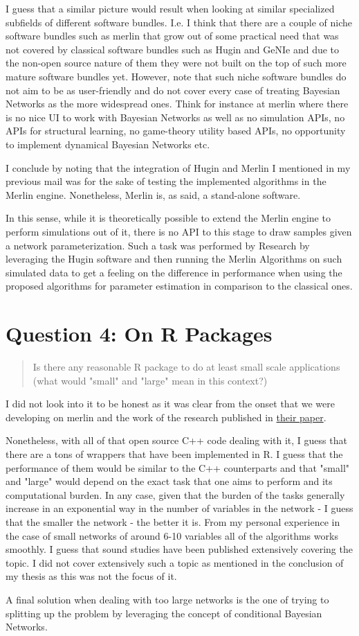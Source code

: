 \documentclass[a4paper]{article}
\begin{document}
I guess that a similar picture would result when looking at similar
specialized subfields of different software bundles. I.e. I think
that there are a couple of niche software bundles such as merlin
that grow out of some practical need that was not covered by
classical software bundles such as Hugin and GeNIe and due to the
non-open source nature of them they were not built on the top of
such more mature software bundles yet. However, note that such niche
software bundles do not aim to be as user-friendly and do not cover
every case of treating Bayesian Networks as the more widespread
ones. Think for instance at merlin where there is no nice UI to work
with Bayesian Networks as well as no simulation APIs, no APIs for structural learning, no
game-theory utility based APIs, no opportunity to implement
dynamical Bayesian Networks etc.

I conclude by noting that the integration of Hugin and Merlin I
mentioned in my previous mail was for the sake of testing the
implemented algorithms in the Merlin engine. Nonetheless, Merlin is,
as said, a stand-alone software.

In this sense, while it is theoretically possible to extend the
Merlin engine to perform simulations out of it, there is no API to
this stage to draw samples given a network parameterization. Such a
task was performed by Research by leveraging the Hugin software and
then running the Merlin Algorithms on such simulated data to get a
feeling on the difference in performance when using the proposed
algorithms for parameter estimation in comparison to the classical ones.


\section{Question 4: On R Packages}
\label{sec:org6d87385}

\begin{quote}
Is there any reasonable R package to do at least small scale
applications (what would "small" and "large" mean in this context?)
\end{quote}

I did not look into it to be honest as it was clear from the 
onset that we were developing on merlin and the work of the research
published in \href{https://ojs.aaai.org/index.php/AAAI/article/view/17447}{their paper}.

Nonetheless, with all of that open source C++ code dealing with it,
I guess that there are a tons of wrappers that have been implemented
in R. I guess that the performance of them would be similar to the
C++ counterparts and that "small" and "large" would depend on the
exact task that one aims to perform and its computational
burden. In any case, given that the burden of the tasks generally
increase in an exponential way in the number of variables in the
network - I guess that the smaller the network - the better it
is. From my personal experience in the case of small networks of
around 6-10 variables all of the algorithms works smoothly. I guess
that sound studies have been published extensively covering the
topic. I did not cover extensively such a topic as mentioned in the
conclusion of my thesis as this was not the focus of it.

A final solution when dealing with too large networks is the one of
trying to splitting up the problem by leveraging the concept of
conditional Bayesian Networks. 
\end{document}
